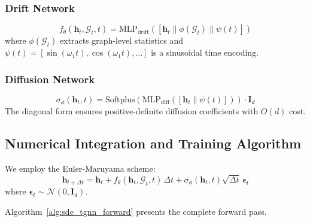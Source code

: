 \documentclass[10pt,journal,compsoc]{IEEEtran}
\newcommand{\N}{\mathcal{N}}
\newcommand{\G}{\mathcal{G}}
\begin{document}
\subsubsection{Drift Network}

\begin{equation}
f_\theta(\mathbf{h}_t, \G_t, t) = \text{MLP}_{\text{drift}}([\mathbf{h}_t \| \phi(\G_t) \| \psi(t)])
\end{equation}
where $\phi(\G_t)$ extracts graph-level statistics and $\psi(t) = [\sin(\omega_1 t), \cos(\omega_1 t), \ldots]$ is a sinusoidal time encoding.

\subsubsection{Diffusion Network}

\begin{equation}
\sigma_\phi(\mathbf{h}_t, t) = \text{Softplus}(\text{MLP}_{\text{diff}}([\mathbf{h}_t \| \psi(t)])) \cdot \mathbf{I}_d
\end{equation}
The diagonal form ensures positive-definite diffusion coefficients with $O(d)$ cost.

\vspace{-0.2cm}
\subsection{Numerical Integration and Training Algorithm}

We employ the Euler-Maruyama scheme:
\begin{equation}
\mathbf{h}_{t+\Delta t} = \mathbf{h}_t + f_\theta(\mathbf{h}_t, \G_t, t)\,\Delta t + \sigma_\phi(\mathbf{h}_t, t)\sqrt{\Delta t}\,\boldsymbol{\epsilon}_t
\end{equation}
where $\boldsymbol{\epsilon}_t \sim \N(0, \mathbf{I}_d)$.

Algorithm~\ref{alg:sde_tgnn_forward} presents the complete forward pass.
\end{document}

